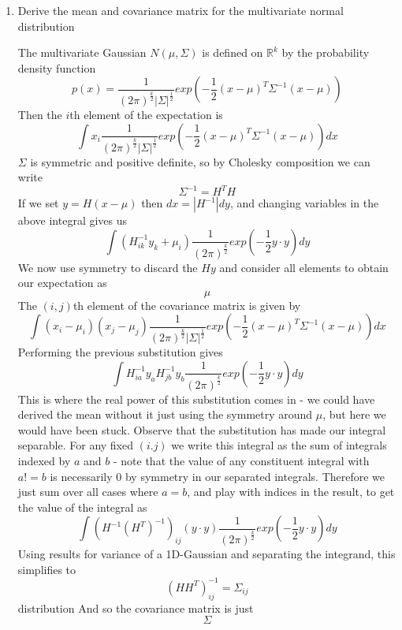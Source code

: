 \documentclass{article}
\newcommand{\chapternumber}{2}
\newenvironment{QandA}{\begin{enumerate}[label=\chapternumber.\arabic*]\bfseries\boldmath}
	{\end{enumerate}}
\newenvironment{answered}{\par\bigskip\normalfont\unboldmath}{}
\begin{document}
\begin{QandA}
		\item Derive the mean and covariance matrix for the multivariate normal distribution
		\begin{answered}
			The multivariate Gaussian $N(\mu,\Sigma)$ is defined on $\mathbb{R}^k$ by the probability density function
			\[p(x)=\frac{1}{(2\pi)^{\frac{k}{2}}|\Sigma|^{\frac{1}{2}}}exp\left(-\frac{1}{2}(x-\mu)^T\Sigma^{-1}(x-\mu)\right)\]
			Then the $i$th element of the expectation is
			\[\int x_i\frac{1}{(2\pi)^{\frac{k}{2}}|\Sigma|^{\frac{1}{2}}}exp\left(-\frac{1}{2}(x-\mu)^T\Sigma^{-1}(x-\mu)\right)dx\]
			$\Sigma$ is symmetric and positive definite, so by Cholesky composition we can write
			\[\Sigma^{-1}=H^TH\]
			If we set $y=H(x-\mu)$ then $dx=|H^{-1}|dy$,
			and changing variables in the above integral gives us
			\[\int (H^{-1}_{ik}y_k+ \mu_i)\frac{1}{(2\pi)^{\frac{k}{2}}}exp\left(-\frac{1}{2}y\cdot y\right)dy\]
			We now use symmetry to discard the $Hy$ and consider all elements to obtain our expectation as
			\[\mu\]
			The $(i,j)$th element of the covariance matrix is given by
			\[\int(x_i-\mu_i)(x_j-\mu_j) \frac{1}{(2\pi)^{\frac{k}{2}}|\Sigma|^{\frac{1}{2}}}exp\left(-\frac{1}{2}(x-\mu)^T\Sigma^{-1}(x-\mu)\right)dx\]
			Performing the previous substitution gives
			\[\int H^{-1}_{ia}y_aH^{-1}_{jb}y_b \frac{1}{(2\pi)^{\frac{k}{2}}}exp\left(-\frac{1}{2}y\cdot y\right)dy\]
			This is where the real power of this substitution comes in - we could have derived the mean without it just using the symmetry around $\mu$, but here we would have been stuck. Observe that the substitution has made our integral separable. For any fixed $(i.j)$ we write this integral as the sum of integrals indexed by $a$ and $b$ - note that the value of any constituent integral with $a!=b$ is necessarily 0 by symmetry in our separated integrals. Therefore we just sum over all cases where $a=b$, and play with indices in the result, to get the value of the integral as \[\int (H^{-1}(H^T)^{-1})_{ij}(y\cdot y) \frac{1}{(2\pi)^{\frac{k}{2}}}exp\left(-\frac{1}{2}y\cdot y\right)dy\]
			Using results for variance of a 1D-Gaussian and separating the integrand, this simplifies to
			\[(HH^T)^{-1}_{ij}=\Sigma_{ij}\]distribution 
			And so the covariance matrix is just
			\[\Sigma\] \end{answered}
		

\end{QandA}
\end{document}
